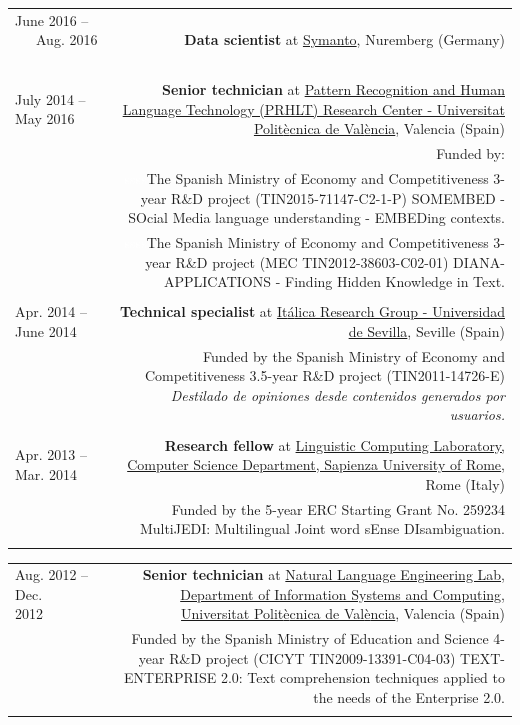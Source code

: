 \documentclass[10pt]{article}
\begin{document}
\begin{tabular}{L!{\VRule}R}
June 2016 -- ~~~Aug. 2016 ~~&{\textbf{Data scientist} at \href{https://www.symanto.com/}{Symanto}, Nuremberg (Germany)}\\&\\

July 2014 -- May 2016 ~~&{\textbf{Senior technician} at \href{http://www.prhlt.upv.es/}{Pattern Recognition and Human Language Technology (PRHLT) Research Center - Universitat Polit{\`e}cnica de Val{\`e}ncia}, Valencia (Spain)}\\
&\scriptsize{Funded by:}\\
&\scriptsize{\textcolor{white}{ssss}The Spanish Ministry of Economy and Competitiveness 3-year R\&D project (TIN2015-71147-C2-1-P) SOMEMBED - SOcial Media language 
understanding - EMBEDing contexts.}\\
&\scriptsize{\textcolor{white}{ssss}The Spanish Ministry of Economy and Competitiveness 3-year R\&D project (MEC TIN2012-38603-C02-01) DIANA-APPLICATIONS - Finding Hidden Knowledge 
in Text.}\\&\\

Apr. 2014 -- June 2014~~~~&{\textbf{Technical specialist} at \href{http://www.lsi.us.es/italica/}{It{\'a}lica Research Group - Universidad de Sevilla}, Seville (Spain)}\\
&\scriptsize{Funded by the Spanish Ministry of Economy and Competitiveness 3.5-year R\&D project (TIN2011-14726-E) \emph{Destilado de opiniones desde contenidos generados por 
usuarios.}}\\&\\
 
Apr. 2013 -- Mar. 2014 ~~&{\textbf{Research fellow} at \href{http://lcl.uniroma1.it/index.html}{Linguistic Computing Laboratory, Computer Science Department, Sapienza University of Rome}, Rome (Italy)}\\
&\scriptsize{Funded by the 5-year ERC Starting Grant No. 259234 MultiJEDI: Multilingual Joint word sEnse DIsambiguation.}\\&\\
\end{tabular}

\begin{tabular}{L!{\VRule}R}
Aug. 2012 -- Dec. 2012~~~~&{\textbf{Senior technician} at \href{http://users.dsic.upv.es/grupos/nle/}{Natural Language Engineering Lab, Department of Information Systems and Computing, Universitat Polit{\`e}cnica de Val{\`e}ncia}, Valencia (Spain)}\\
&\scriptsize{Funded by the Spanish Ministry of Education and Science 4-year R\&D project (CICYT TIN2009-13391-C04-03) TEXT-ENTERPRISE 2.0: Text comprehension techniques
applied to the needs of the Enterprise 2.0.}\\&\\
\end{tabular}
\end{document}
